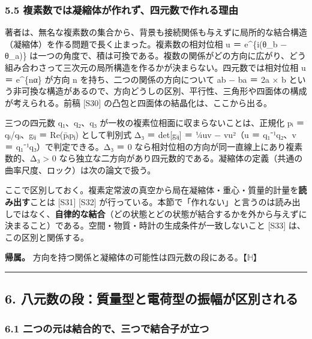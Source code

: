 \documentclass[
  a4paper,
]{ltjsarticle}
\begin{document}
\subsubsection{5.5
複素数では凝縮体が作れず、四元数で作れる理由}\label{ux8907ux7d20ux6570ux3067ux306fux51ddux7e2eux4f53ux304cux4f5cux308cux305aux56dbux5143ux6570ux3067ux4f5cux308cux308bux7406ux7531}

著者は、無名な複素数の集合から、背景も接続関係も与えずに局所的な結合構造（凝縮体）を作る問題で長く止まった。複素数の相対位相
u ＝ e\^{}\{i(θ\_b − θ\_a)\}
は一つの角度で、積は可換である。複数の関係がどの方向に広がり、どう組み合わさって三次元の局所構造を作るかが決まらない。四元数では相対位相
u ＝ e\^{}\{nα\} が方向 n を持ち、二つの関係の方向について ab − ba ＝ 2a
× b
という非可換な構造があるので、方向どうしの区別、平行性、三角形や四面体の構成が考えられる。前稿
{[}S30{]} の凸包と四面体の結晶化は、ここから出る。

三つの四元数 q₁、q₂、q₃ が一枚の複素位相面に収まらないことは、正規化 pᵢ
＝ qᵢ/\textbar qᵢ\textbar、gᵢⱼ ＝ Re(p̄ᵢpⱼ) として判別式 Δ₃ ＝
det{[}gᵢⱼ{]} ＝ ¼\textbar uv − vu\textbar²（u ＝ q₁⁻¹q₂、v ＝
q₁⁻¹q₃）で判定できる。Δ₃ ＝ 0
なら相対位相の方向が同一直線上にあり複素数的、Δ₃ \textgreater{} 0
なら独立な二方向があり四元数的である。凝縮体の定義（共通の曲率尺度、ロック）は次の論文で扱う。

ここで区別しておく。複素定常波の真空から局在凝縮体・重心・質量的計量を\textbf{読み出す}ことは
{[}S31{]} {[}S32{]}
が行っている。本節で「作れない」と言うのは読み出しではなく、\textbf{自律的な結合}（どの状態とどの状態が結合するかを外から与えずに決まること）である。空間・物質・時計の生成条件が一致しないこと
{[}S33{]} は、この区別と関係する。

\textbf{帰属。}
方向を持つ関係と凝縮体の可能性は四元数の段にある。【\(\mathbb{H}\)】

\begin{center}\rule{0.5\linewidth}{0.5pt}\end{center}

\subsection{6.
八元数の段：質量型と電荷型の振幅が区別される}\label{ux516bux5143ux6570ux306eux6bb5ux8ceaux91cfux578bux3068ux96fbux8377ux578bux306eux632fux5e45ux304cux533aux5225ux3055ux308cux308b}

\subsubsection{6.1
二つの元は結合的で、三つで結合子が立つ}\label{ux4e8cux3064ux306eux5143ux306fux7d50ux5408ux7684ux3067ux4e09ux3064ux3067ux7d50ux5408ux5b50ux304cux7acbux3064}
\end{document}
